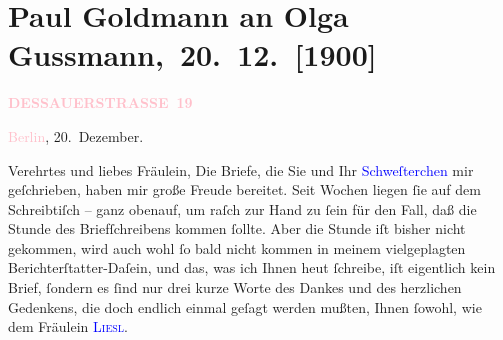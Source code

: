 

\renewcommand{\erwaehntePersonen}{Personen:  Aristophanes, Paul Goldmann, Friedrich Hebbel, Alfred Klaar, Paul Marx, Olga Schnitzler, Elisabeth Steinrück, Leo N. von Tolstoi, Adolf von Wilbrandt}
\renewcommand{\erwaehnteInstitutionen}{Institutionen: Bohemia, Deutsches Theater Berlin, Schauspielhaus Berlin, Vossische Zeitung}
\renewcommand{\erwaehnteOrte}{Orte: Berlin, Berliner Theater, Café Josty, Dessauer Straße, Rotensterngasse, Wien}
\renewcommand{\erwaehnteWerke}{Werke: Agnes Bernauer, Die Macht der Finsternis, Frauenherrschaft. Lustspiel in vier Aufzügen nach Aristophanes’ »Ekklesiazusen« und »Lysistrate«}
\section[ Paul Goldmann an Olga Gussmann, 20. 12. {[}1900{]}]{Paul Goldmann an Olga Gussmann, 20. 12. {[}1900{]}}
\nopagebreak{}
\rehead{ }\normalsize\beginnumbering{}
\toendnotes[C]{\smallbreak\pagebreak[2]}
\toendnotes[C]{\smallbreak}
\pstart
           \noindent{}\raggedleft{}{\pb}\textcolor{gray}{\textbf{\textcolor{pink}{DESSAUERSTRASSE 19}{}\ledrightnote{\textcolor{pink}{Dessauer Straße}}}}\pend
           
\pstart
           \textcolor{pink}{Berlin}{}\ledrightnote{\textcolor{pink}{Berlin}}, 20. Dezember.\pend
           
\pstart\center{}Verehrtes und liebes Fräulein,\pend
\pstart
           Die Briefe, die Sie und Ihr \textcolor{blue}{Schweſterchen}{}\ledrightnote{{$\rightarrow$}\textcolor{blue}{Elisabeth Steinrück}} mir geſchrieben, haben mir  große Freude bereitet. Seit Wochen liegen ſie auf dem Schreibtiſch – ganz
               obenauf, um raſch zur Hand zu ſein für den Fall, daß die Stunde des Briefſchreibens
               kommen ſollte. Aber die Stunde iſt bisher nicht gekommen, wird auch wohl ſo bald
               nicht kommen in meinem vielgeplagten Berichterſtatter-Daſein, und das, was ich Ihnen
                  heut ſchreibe, iſt eigentlich kein Brief, ſondern
               es ſind nur drei kurze Worte des Dankes und des herzlichen Gedenkens, die doch
               endlich einmal geſagt werden mußten, Ihnen {\pb}ſowohl,
               wie dem Fräulein \textsc{\textcolor{blue}{Liesl}{}\ledrightnote{\textcolor{blue}{Elisabeth Steinrück}}}.\pend
           
